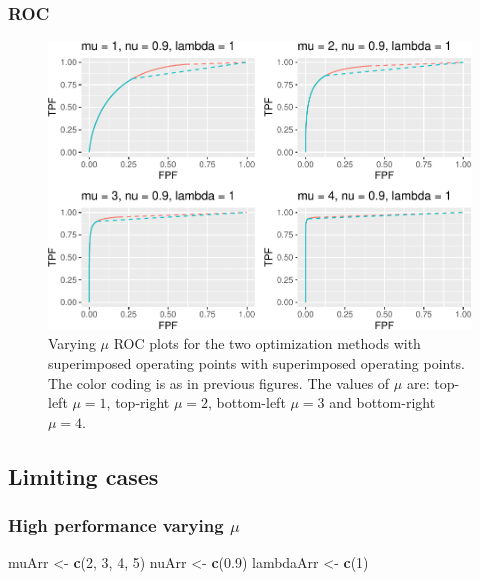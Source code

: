 \documentclass[
]{book}
\newenvironment{Shaded}{\begin{snugshade}}{\end{snugshade}}
\newcommand{\DecValTok}[1]{\textcolor[rgb]{0.00,0.00,0.81}{#1}}
\newcommand{\FloatTok}[1]{\textcolor[rgb]{0.00,0.00,0.81}{#1}}
\newcommand{\KeywordTok}[1]{\textcolor[rgb]{0.13,0.29,0.53}{\textbf{#1}}}
\newcommand{\NormalTok}[1]{#1}
\newcommand{\StringTok}[1]{\textcolor[rgb]{0.31,0.60,0.02}{#1}}
\begin{document}
\hypertarget{roc-4}{%
\subsubsection{ROC}\label{roc-4}}

\begin{figure}
\centering
\includegraphics{21-optim-op-point_files/figure-latex/optim-op-point-vary-mu-roc-1.pdf}
\caption{\label{fig:optim-op-point-vary-mu-roc}Varying \(\mu\) ROC plots for the two optimization methods with superimposed operating points with superimposed operating points. The color coding is as in previous figures. The values of \(\mu\) are: top-left \(\mu = 1\), top-right \(\mu = 2\), bottom-left \(\mu = 3\) and bottom-right \(\mu = 4\).}
\end{figure}

\hypertarget{optim-op-point-limiting-situations}{%
\subsection{Limiting cases}\label{optim-op-point-limiting-situations}}

\hypertarget{optim-op-point-high-performance-vary-mu}{%
\subsubsection{\texorpdfstring{High performance varying \(\mu\)}{High performance varying \textbackslash mu}}\label{optim-op-point-high-performance-vary-mu}}

\begin{Shaded}
\begin{Highlighting}[]
\NormalTok{muArr <-}\StringTok{ }\KeywordTok{c}\NormalTok{(}\DecValTok{2}\NormalTok{, }\DecValTok{3}\NormalTok{, }\DecValTok{4}\NormalTok{, }\DecValTok{5}\NormalTok{)}
\NormalTok{nuArr <-}\StringTok{ }\KeywordTok{c}\NormalTok{(}\FloatTok{0.9}\NormalTok{)}
\NormalTok{lambdaArr <-}\StringTok{ }\KeywordTok{c}\NormalTok{(}\DecValTok{1}\NormalTok{)}
\end{Highlighting}
\end{Shaded}
\end{document}
